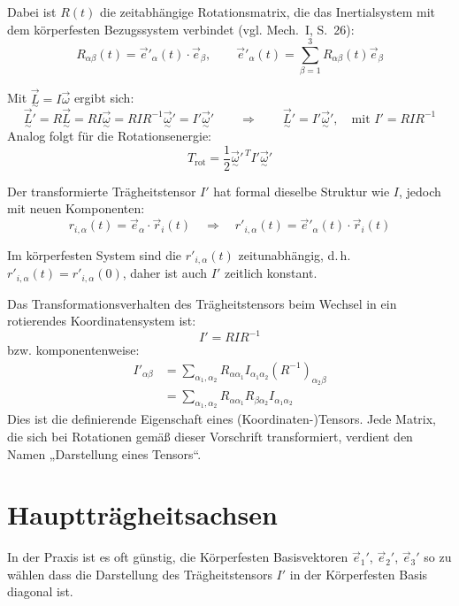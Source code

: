 \documentclass[10pt, letterpaper]{article}
\begin{document}
Dabei ist $R(t)$ die zeitabhängige Rotationsmatrix, die das Inertialsystem mit dem körperfesten Bezugssystem verbindet (vgl. Mech.~I, S.~26):
\[
R_{\alpha\beta}(t) = \vec{e}'_\alpha(t) \cdot \vec{e}_\beta, \qquad
\vec{e}'_\alpha(t) = \sum_{\beta=1}^3 R_{\alpha\beta}(t) \vec{e}_\beta
\]

Mit $\vec{\underset{\sim}{L}} = I \vec{\omega}$ ergibt sich:
\[
\vec{\underset{\sim}{L}}' = R \vec{\underset{\sim}{L}} = R I \vec{\underset{\sim}{\omega}} = R I R^{-1} \vec{\underset{\sim}{\omega}}' = I' \vec{\underset{\sim}{\omega}}' \qquad \Rightarrow \qquad \vec{\underset{\sim}{L}}' = I' \vec{\underset{\sim}{\omega}}', \quad \text{mit } I' = R I R^{-1}
\]
Analog folgt für die Rotationsenergie:
\[
T_{\text{rot}} = \frac{1}{2} \vec{\underset{\sim}{\omega}}'^{\,T} I' \vec{\underset{\sim}{\omega}}'
\]

Der transformierte Trägheitstensor $I'$ hat formal dieselbe Struktur wie $I$, jedoch mit neuen Komponenten:
\[
r_{i,\alpha}(t) = \vec{e}_\alpha \cdot \vec{r}_i(t)
\quad \Rightarrow \quad
r'_{i,\alpha}(t) = \vec{e}'_\alpha(t) \cdot \vec{r}_i(t)
\]

Im körperfesten System sind die $r'_{i,\alpha}(t)$ zeitunabhängig, d.\,h. $r'_{i,\alpha}(t) = r'_{i,\alpha}(0)$, daher ist auch $I'$ zeitlich konstant.

Das Transformationsverhalten des Trägheitstensors beim Wechsel in ein rotierendes Koordinatensystem ist:
\[
I' = R I R^{-1}
\]
bzw. komponentenweise:
\[
\begin{aligned}
I'_{\alpha\beta} &= \sum_{\alpha_1, \alpha_2} R_{\alpha \alpha_1} I_{\alpha_1 \alpha_2} (R^{-1})_{\alpha_2 \beta} \\
&= \sum_{\alpha_1, \alpha_2} R_{\alpha \alpha_1} R_{\beta \alpha_2} I_{\alpha_1 \alpha_2}
\end{aligned}
\]
Dies ist die definierende Eigenschaft eines (Koordinaten-)Tensors. Jede Matrix, die sich bei Rotationen gemäß dieser Vorschrift transformiert, verdient den Namen „Darstellung eines Tensors“.










\section*{Hauptträgheitsachsen}

In der Praxis ist es oft günstig, die Körperfesten Basisvektoren $\vec{e}_1'$, $\vec{e}_2'$, $\vec{e}_3'$ so zu wählen dass die Darstellung des Trägheitstensors $I'$ in der Körperfesten Basis diagonal ist.
\end{document}
